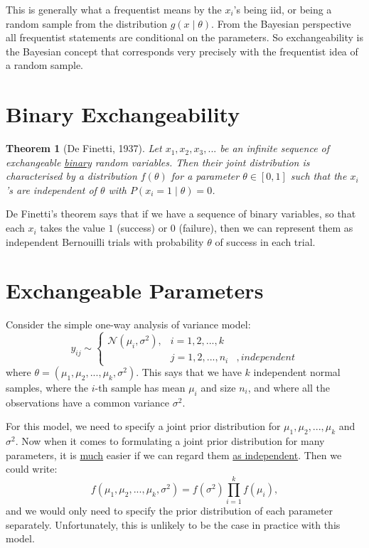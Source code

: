 \documentclass[lecture,12pt,]{pcms-l}
\numberwithin{section}{chapter}
\numberwithin{equation}{chapter}
\theoremstyle{plain}
\newtheorem{theorem}[equation]{Theorem}
\theoremstyle{definition}
\theoremstyle{definition}
\begin{document}
This is generally what a frequentist means by the $x_i$'s being iid, or being a random sample from the distribution $g(x \mid \theta)$. From the Bayesian perspective all frequentist statements are conditional on the parameters. So exchangeability is the Bayesian concept that corresponds very precisely with the frequentist idea of a random sample.

\section{Binary Exchangeability}

\begin{theorem}[De Finetti, 1937]
Let $x_1,x_2,x_3,...$ be an infinite sequence of exchangeable \underline{binary} random variables. Then their joint distribution is characterised by a distribution $f(\theta)$ for a parameter $\theta \in \left [ 0,1 \right ]$ such that the $x_i$'s are independent of $\theta$ with $P(x_i =1 \mid \theta)=0$.
\end{theorem}

De Finetti's theorem says that if we have a sequence of binary variables, so that each $x_i$ takes the value $1$ (success) or $0$ (failure), then we can represent them as independent Bernouilli trials with probability $\theta$ of success in each trial.

\section{Exchangeable Parameters}
Consider the simple one-way analysis of variance model:
\begin{equation}
y_{ij} \sim \left\{\begin{matrix}
\mathcal{N}(\mu_i,\sigma^2), & i=1,2,...,k& \\ 
 &j=1,2,...,n_i &,independent
\end{matrix}\right.
\end{equation}
where $\theta = (\mu_1,\mu_2,...,\mu_k,\sigma^2)$. This says that we have $k$ independent normal samples, where the $i$-th sample has mean $\mu_i$ and size $n_i$, and where all the observations have a common variance $\sigma^2$.

For this model, we need to specify a joint prior distribution for $\mu_1,\mu_2,...,\mu_k$ and $\sigma^2$. Now when it comes to formulating a joint prior distribution for many parameters, it is \underline{much} easier if we can regard them \underline{as independent}. Then we could write:
\begin{equation}
f(\mu_1,\mu_2,...,\mu_k,\sigma^2)=f(\sigma^2) \prod_{i=1}^{k}f(\mu_i),
\end{equation}
and we would only need to specify the prior distribution of each parameter separately. Unfortunately, this is unlikely to be the case in practice with this model.
\end{document}
